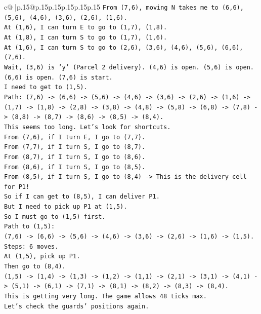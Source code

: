 \documentclass{article}
\begin{document}
{\begin{supertabular}{c@{$\;$}|p{.15\linewidth}@{}p{.15\linewidth}p{.15\linewidth}p{.15\linewidth}p{.15\linewidth}p{.15\linewidth}}
{{{\texttt{From (7,6), moving N takes me to (6,6), (5,6), (4,6), (3,6), (2,6), (1,6).} \\
\texttt{At (1,6), I can turn E to go to (1,7), (1,8).} \\
\texttt{At (1,8), I can turn S to go to (1,7), (1,6).} \\
\texttt{At (1,6), I can turn S to go to (2,6), (3,6), (4,6), (5,6), (6,6), (7,6).} \\
\texttt{Wait, (3,6) is 'y' (Parcel 2 delivery). (4,6) is open. (5,6) is open. (6,6) is open. (7,6) is start.} \\
\texttt{I need to get to (1,5).} \\
\texttt{Path: (7,6) {-}> (6,6) {-}> (5,6) {-}> (4,6) {-}> (3,6) {-}> (2,6) {-}> (1,6) {-}> (1,7) {-}> (1,8) {-}> (2,8) {-}> (3,8) {-}> (4,8) {-}> (5,8) {-}> (6,8) {-}> (7,8) {-}> (8,8) {-}> (8,7) {-}> (8,6) {-}> (8,5) {-}> (8,4).} \\
\texttt{This seems too long. Let's look for shortcuts.} \\
\texttt{From (7,6), if I turn E, I go to (7,7).} \\
\texttt{From (7,7), if I turn S, I go to (8,7).} \\
\texttt{From (8,7), if I turn S, I go to (8,6).} \\
\texttt{From (8,6), if I turn S, I go to (8,5).} \\
\texttt{From (8,5), if I turn S, I go to (8,4) {-}> This is the delivery cell for P1!} \\
\texttt{So if I can get to (8,5), I can deliver P1.} \\
\texttt{But I need to pick up P1 at (1,5).} \\
\texttt{So I must go to (1,5) first.} \\
\texttt{Path to (1,5):} \\
\texttt{(7,6) {-}> (6,6) {-}> (5,6) {-}> (4,6) {-}> (3,6) {-}> (2,6) {-}> (1,6) {-}> (1,5).} \\
\texttt{Steps: 6 moves.} \\
\texttt{At (1,5), pick up P1.} \\
\texttt{Then go to (8,4).} \\
\texttt{(1,5) {-}> (1,4) {-}> (1,3) {-}> (1,2) {-}> (1,1) {-}> (2,1) {-}> (3,1) {-}> (4,1) {-}> (5,1) {-}> (6,1) {-}> (7,1) {-}> (8,1) {-}> (8,2) {-}> (8,3) {-}> (8,4).} \\
\texttt{This is getting very long. The game allows 48 ticks max.} \\
\texttt{Let's check the guards' positions again.} \\
}}}
\end{supertabular}}
\end{document}
